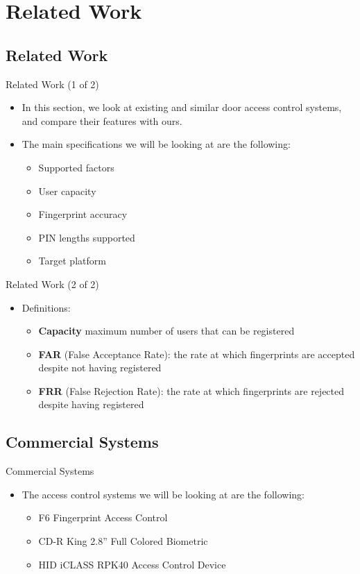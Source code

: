 \section{Related Work}
\subsection{Related Work}
\begin{frame}{Related Work (1 of 2)}
\begin{itemize}
    \item<1-> In this section, we look at existing and similar door access control systems, and compare their features with ours.
    \item<2-> The main specifications we will be looking at are the following:
    \begin{itemize}
    	\item<3-> Supported factors
    	\item<4-> User capacity
    	\item<5-> Fingerprint accuracy
    	\item<6-> PIN lengths supported
    	\item<7-> Target platform
    \end{itemize}
\end{itemize}
\end{frame}

\begin{frame}{Related Work (2 of 2)}
\begin{itemize}
	\item<1-> Definitions:
    \begin{itemize}
    	\item<2-> \textbf{Capacity} maximum number of users that can be registered
    	\item<3-> \textbf{FAR} (False Acceptance Rate): the rate at which fingerprints are accepted despite not having registered
    	\item<4-> \textbf{FRR} (False Rejection Rate): the rate at which fingerprints are rejected despite having registered
    \end{itemize}
\end{itemize}
\end{frame}

\subsection{Commercial Systems}
\begin{frame}{Commercial Systems}
\begin{itemize}
    \item<1-> The access control systems we will be looking at are the following:
    \begin{itemize}
    	\item<2-> F6 Fingerprint Access Control 
    	\item<3-> CD-R King 2.8'' Full Colored Biometric
    	\item<4-> HID iCLASS RPK40 Access Control Device
    \end{itemize}
\end{itemize}
\end{frame}


